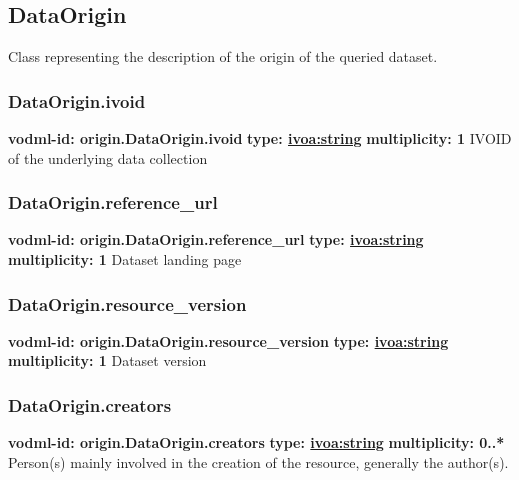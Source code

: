   \subsection{DataOrigin}
  \label{sect:origin.DataOrigin}
    Class representing the description of the origin of the queried dataset.

    \subsubsection{DataOrigin.ivoid}
      \textbf{vodml-id: origin.DataOrigin.ivoid} \newline
      \textbf{type: \hyperref[sect:ivoa]{ivoa:string}} \newline
      \textbf{multiplicity: 1} \newline
      IVOID of the underlying data collection

    \subsubsection{DataOrigin.reference\_url}
      \textbf{vodml-id: origin.DataOrigin.reference\_url} \newline
      \textbf{type: \hyperref[sect:ivoa]{ivoa:string}} \newline
      \textbf{multiplicity: 1} \newline
      Dataset landing page

    \subsubsection{DataOrigin.resource\_version}
      \textbf{vodml-id: origin.DataOrigin.resource\_version} \newline
      \textbf{type: \hyperref[sect:ivoa]{ivoa:string}} \newline
      \textbf{multiplicity: 1} \newline
      Dataset version

    \subsubsection{DataOrigin.creators}
      \textbf{vodml-id: origin.DataOrigin.creators} \newline
      \textbf{type: \hyperref[sect:ivoa]{ivoa:string}} \newline
      \textbf{multiplicity: 0..*} \newline
      Person(s) mainly involved in the creation of the resource, generally the author(s).

